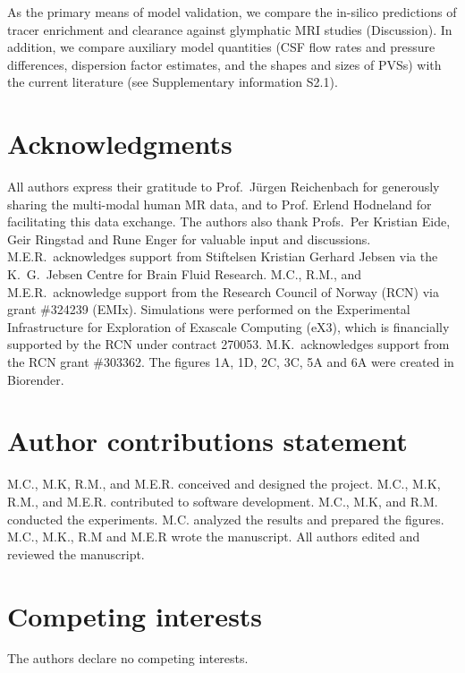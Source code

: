 \documentclass[fleqn,10pt]{wlscirep}
\begin{document}
As the primary means of model validation, we compare the in-silico
predictions of tracer enrichment and clearance against glymphatic MRI
studies (Discussion). In addition, we compare auxiliary model
quantities (CSF flow rates and pressure differences, dispersion factor
estimates, and the shapes and sizes of PVSs) with the current
literature (see Supplementary information S2.1).

\section*{Acknowledgments}

All authors express their gratitude to Prof.~Jürgen Reichenbach for
generously sharing the multi-modal human MR data, and to Prof. Erlend
Hodneland for facilitating this data exchange. The authors also thank
Profs.~Per Kristian Eide, Geir Ringstad and Rune Enger for valuable
input and discussions. M.E.R.~acknowledges support from Stiftelsen
Kristian Gerhard Jebsen via the K.~G.~Jebsen Centre for Brain Fluid
Research. M.C., R.M., and M.E.R.~acknowledge support from the Research
Council of Norway (RCN) via grant \#324239 (EMIx). Simulations were
performed on the Experimental Infrastructure for Exploration of
Exascale Computing (eX3), which is financially supported by the RCN
under contract 270053. M.K.~acknowledges support from the RCN grant
\#303362. The figures 1A, 1D, 2C, 3C, 5A and 6A were created in
Biorender.

\section*{Author contributions statement}

M.C., M.K, R.M., and M.E.R. conceived and designed the project.
M.C., M.K, R.M., and M.E.R. contributed to software development. 
M.C., M.K, and R.M. conducted the experiments.
M.C. analyzed the results and prepared the figures.
M.C., M.K., R.M and M.E.R wrote the manuscript. 
All authors edited and reviewed the manuscript.

\section*{Competing interests}

The authors declare no competing interests.



\end{document}
